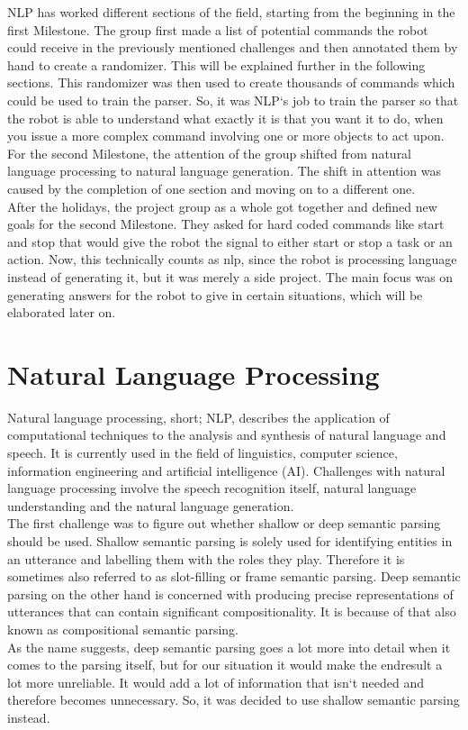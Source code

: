 \documentclass[main.tex]{subfiles}
\begin{document}
		
		
			
	NLP has worked different sections of the field, starting from the beginning in the first Milestone. The group first made a list of potential commands the robot could receive in the previously mentioned challenges and then annotated them by hand to create a randomizer. This will be explained further in the following sections. This randomizer was then used to create thousands of commands which could be used to train the parser. So, it was NLP‘s job to train the parser so that the robot is able to understand what exactly it is that you want it to do, when you issue a more complex command involving one or more objects to act upon.\\ 
	For the second Milestone, the attention of the group shifted from natural language processing to natural language generation. The shift in attention was caused by the completion of one section and moving on to a different one.\\ 
	After the holidays, the project group as a whole got together and defined new goals for the second Milestone. They asked for hard coded commands like start and stop that would give the robot the signal to either start or stop a task or an action. Now, this technically counts as nlp, since the robot is processing language instead of generating it, but it was merely a side project. The main focus was on generating answers for the robot to give in certain situations, which will be elaborated later on.
		
	 \section{Natural Language Processing}
	Natural language processing, short; NLP, describes the application of computational techniques to the analysis and synthesis of natural language and speech. It is currently used in the field of linguistics, computer science, information engineering and artificial intelligence (AI). Challenges with natural language processing involve the speech recognition itself, natural language understanding and the natural language generation.\\ 
	The first challenge was to figure out whether shallow or deep semantic parsing should be used. Shallow semantic parsing is solely used for identifying entities in an utterance and labelling them with the roles they play. Therefore it is sometimes also referred to as slot-filling or frame semantic parsing. Deep semantic parsing on the other hand is concerned with producing precise representations of utterances that can contain significant compositionality. It is because of that also known as compositional semantic parsing.\\ 
	As the name suggests, deep semantic parsing goes a lot more into detail when it comes to the parsing itself, but for our situation it would make the endresult a lot more unreliable. It would add a lot of information that isn‘t needed and therefore becomes unnecessary. So, it was decided to use shallow semantic parsing instead.
\end{document}
